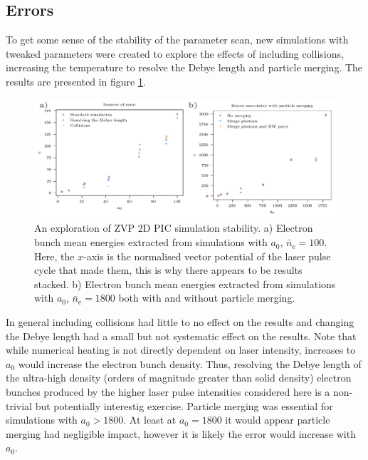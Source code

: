 

\subsection{Errors}
To get some sense of the stability of the parameter scan, new simulations with tweaked parameters were created to explore the effects of including collisions, increasing the temperature to resolve the Debye length and particle merging. The results are presented in figure \ref{fig:zvperrorsources}. 
\begin{figure}
	\centering
	\includegraphics[width=1\linewidth]{figures/zvp/zvp_error_sources}
	\caption[An exploration of ZVP 2D PIC simulation stability.]{An exploration of ZVP 2D PIC simulation stability. a) Electron bunch mean energies extracted from simulations with $a_0$, $\bar{n}_\mathrm{e} =100$. Here, the $x$-axis is the normalised vector potential of the laser pulse cycle that made them, this is why there appears to be results stacked. b) Electron bunch mean energies extracted from simulations with $a_0$, $\bar{n}_\mathrm{e} =1800$ both with and without particle merging.}
	\label{fig:zvperrorsources}
\end{figure}
In general including collisions had little to no effect on the results and changing the Debye length had a small but not systematic effect on the results. Note that while numerical heating is not directly dependent on laser intensity, increases to $a_0$ would increase the electron bunch density. Thus, resolving the Debye length of the ultra-high density (orders of magnitude greater than solid density) electron bunches produced by the higher laser pulse intensities considered here is a non-trivial but potentially interestig exercise. Particle merging was essential for simulations with $a_0 > 1800$. At least at $a_0 = 1800$ it would appear particle merging had negligible impact, however it is likely the error would increase with $a_0$.

